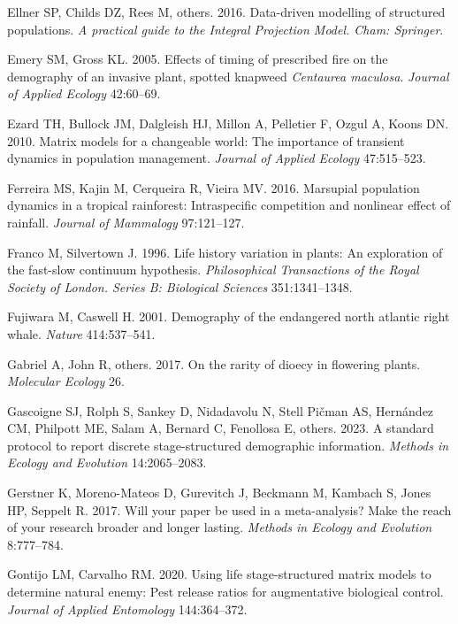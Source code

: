 \documentclass[
  12pt,
  letterpaper,
]{book}
\newlength{\cslhangindent}
\newenvironment{CSLReferences}[2] %
 {\begin{list}{}{%
  \setlength{\itemindent}{0pt}
  \setlength{\leftmargin}{0pt}
  \setlength{\parsep}{0pt}
  \ifodd #1
   \setlength{\leftmargin}{\cslhangindent}
   \setlength{\itemindent}{-1\cslhangindent}
  \fi
  \setlength{\itemsep}{#2\baselineskip}}}
 {\end{list}}
\begin{document}
\begin{CSLReferences}{1}{0}
Ellner SP, Childs DZ, Rees M, others. 2016. Data-driven modelling of
structured populations. \emph{A practical guide to the Integral
Projection Model. Cham: Springer}.

Emery SM, Gross KL. 2005. Effects of timing of prescribed fire on the
demography of an invasive plant, spotted knapweed \emph{{C}entaurea
{m}aculosa}. \emph{Journal of Applied Ecology} 42:60--69.

Ezard TH, Bullock JM, Dalgleish HJ, Millon A, Pelletier F, Ozgul A,
Koons DN. 2010. Matrix models for a changeable world: The importance of
transient dynamics in population management. \emph{Journal of Applied
Ecology} 47:515--523.

Ferreira MS, Kajin M, Cerqueira R, Vieira MV. 2016. Marsupial population
dynamics in a tropical rainforest: Intraspecific competition and
nonlinear effect of rainfall. \emph{Journal of Mammalogy} 97:121--127.

Franco M, Silvertown J. 1996. Life history variation in plants: An
exploration of the fast-slow continuum hypothesis. \emph{Philosophical
Transactions of the Royal Society of London. Series B: Biological
Sciences} 351:1341--1348.

Fujiwara M, Caswell H. 2001. Demography of the endangered north atlantic
right whale. \emph{Nature} 414:537--541.

Gabriel A, John R, others. 2017. On the rarity of dioecy in flowering
plants. \emph{Molecular Ecology} 26.

Gascoigne SJ, Rolph S, Sankey D, Nidadavolu N, Stell Pičman AS,
Hernández CM, Philpott ME, Salam A, Bernard C, Fenollosa E, others.
2023. A standard protocol to report discrete stage-structured
demographic information. \emph{Methods in Ecology and Evolution}
14:2065--2083.

Gerstner K, Moreno-Mateos D, Gurevitch J, Beckmann M, Kambach S, Jones
HP, Seppelt R. 2017. Will your paper be used in a meta-analysis? Make
the reach of your research broader and longer lasting. \emph{Methods in
Ecology and Evolution} 8:777--784.

Gontijo LM, Carvalho RM. 2020. Using life stage-structured matrix models
to determine natural enemy: Pest release ratios for augmentative
biological control. \emph{Journal of Applied Entomology} 144:364--372.


\end{CSLReferences}
\end{document}
